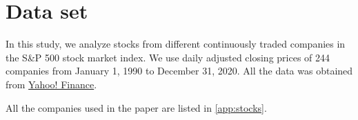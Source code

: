 \section{Data set}\label{sec:data_set}

In this study, we analyze stocks from different continuously traded companies
in the S\&P 500 stock market index. We use daily adjusted closing prices of 244
companies from January 1, 1990 to December 31, 2020. All the data was obtained
from \href{https://finance.yahoo.com/}{Yahoo! Finance}.

All the companies used in the paper are listed in  \ref{app:stocks}.